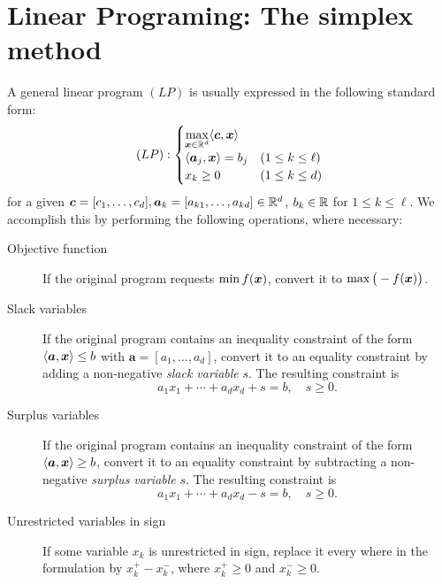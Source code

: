 
\section{Linear Programing: The simplex method}

A general linear program $(LP)$ is usually expressed in the following standard form:
\begin{equation*}
(LP): \begin{cases}
\displaystyle{\max_{\boldsymbol{x}\in \mathbb{R}^d} \langle \boldsymbol{c}, \boldsymbol{x}\rangle} \\
\langle \boldsymbol{a}_j, \boldsymbol{x} \rangle = b_j &(1 \leq k \leq \ell) \\
x_k \geq 0 &(1 \leq k \leq d) 
\end{cases}
\end{equation*}
for a given $\boldsymbol{c}=[c_1, \dotsc, c_d], \boldsymbol{a}_k = [a_{k1}, \dots, a_{kd} ] \in \mathbb{R}^d$, $b_k \in \mathbb{R}$ for $1 \leq k \leq \ell$.  We accomplish this by performing the following operations, where necessary:
\begin{description}
	\item[Objective function] If the original program requests $\min f(\boldsymbol{x})$, convert it to $\max \big( -f(\boldsymbol{x}) \big)$.
	\item [Slack variables] If the original program contains an inequality constraint of the form $\langle \boldsymbol{a}, \boldsymbol{x} \rangle \leq b$ with $\boldsymbol{a} = [a_1, \dotsc, a_d]$, convert it to an equality constraint by adding a non-negative \emph{slack variable} $s$. The resulting constraint is 
	\begin{equation*}
	a_1 x_1 + \dotsb + a_d x_d + s = b, \quad s \geq 0.
	\end{equation*}
	\item [Surplus variables] If the original program contains an inequality constraint of the form $\langle \boldsymbol{a}, \boldsymbol{x} \rangle \geq b$, convert it to an equality constraint by subtracting a non-negative \emph{surplus variable} $s$.  The resulting constraint is
	\begin{equation*}
	a_1 x_1 + \dotsb + a_d x_d - s = b, \quad s \geq 0.
	\end{equation*}
	\item[Unrestricted variables in sign] If some variable $x_k$ is unrestricted in sign, replace it every where in the formulation by $x_k^+ - x_k^-$, where $x_k^+ \geq 0$ and $x_k^- \geq 0$.
\end{description}

